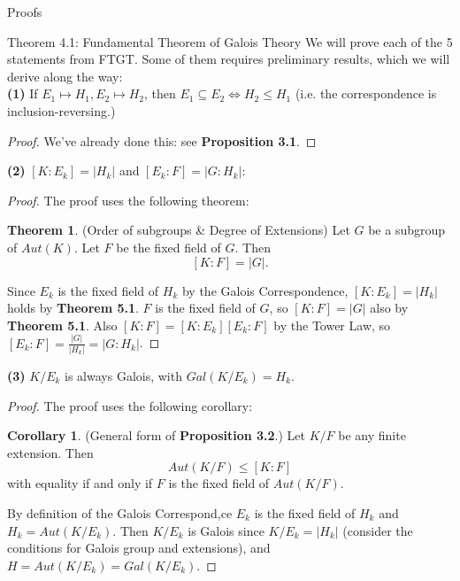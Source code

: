 \documentclass[12pt]{article}
\theoremstyle{definition}
\newtheorem{corollary}{Corollary}[section]
\theoremstyle{definition}
\theoremstyle{definition}
\theoremstyle{definition}
\newtheorem{theorem}{Theorem}[section]
\theoremstyle{definition}
\theoremstyle{definition}
\theoremstyle{definition}
\begin{document}
\begin{section}{Proofs}
    \begin{subsection}{Theorem 4.1: Fundamental Theorem of Galois Theory}
        We will prove each of the 5 statements from FTGT. Some of them requires preliminary results, which we will derive along the way:\\
        \noindent\textbf{(1)} If \(E_1 \mapsto H_1, E_2 \mapsto H_2\), then \(E_1\subseteq E_2\Leftrightarrow H_2 \leq H_1\) (i.e. the correspondence is 
        inclusion-reversing.)
        \begin{proof}
            We've already done this: see \textbf{Proposition 3.1}.
        \end{proof}

        \noindent\textbf{(2)} \([K:E_k] = \left| H_k \right|\) and \([E_k:F] = \left| G:H_k \right|\):
        \begin{figure}[H]
            \centering
        \end{figure}
        \begin{proof}
            The proof uses the following theorem:
            \begin{theorem}{(Order of subgroups \& Degree of Extensions)}
                Let \(G\) be a subgroup of \(Aut(K)\). Let \(F\) be the fixed field of \(G\). Then 
                \[[K:F] = \left| G \right|.\]
            \end{theorem}
            Since \(E_k\) is the fixed field of \(H_k\) by the Galois Correspondence, \([K: E_k] = \left| H_k \right|\) holds by \textbf{Theorem 5.1}.
            \(F\) is the fixed field of \(G\), so \([K:F] = \left| G \right|\) also by \textbf{Theorem 5.1}. Also 
            \([K:F] = [K:E_k][E_k:F]\) by the Tower Law, so \([E_k:F] = \frac{\left|G\right|}{\left|H_k\right|} = \left|G:H_k\right|\).
        \end{proof}

        \noindent\textbf{(3)} \(K/E_k\) is always Galois, with \(Gal(K/E_k) = H_k\).
        \begin{proof}
            The proof uses the following corollary:
            \begin{corollary}{(General form of \textbf{Proposition 3.2}.)}
                Let \(K/F\) be any finite extension. Then 
                \[Aut(K/F) \leq [K:F]\]
                with equality if and only if \(F\) is the fixed field of \(Aut(K/F)\).
            \end{corollary}
            By definition of the Galois Correspond,ce \(E_k\) is the fixed field of \(H_k\) and \(H_k = Aut(K/E_k)\). Then 
            \(K/E_k\) is Galois since \(K/E_k = \left|H_k\right|\) (consider the conditions for Galois group and extensions),
            and \(H=Aut(K/E_k) = Gal(K/E_k)\).
        \end{proof}


\end{subsection}
\end{section}
\end{document}
